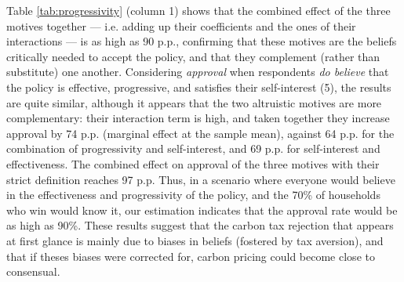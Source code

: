 \documentclass[11pt]{article}
\begin{document}

Table \ref{tab:progressivity} (column 1) shows that the combined effect of the three motives together --- i.e. adding up their coefficients and the ones of their interactions --- is as high as 90 p.p., confirming that these motives are the beliefs critically needed to accept the policy, and that they complement (rather than substitute) one another. Considering \textit{approval} when respondents \textit{do believe} that the policy is effective, progressive, and satisfies their self-interest (5), the results are quite similar, although it appears that the two altruistic motives are more complementary: their interaction term is high, and taken together they increase approval by 74 p.p. (marginal effect at the sample mean), against 64 p.p. for the combination of progressivity and self-interest, and 69 p.p. for self-interest and effectiveness. The combined effect on approval of the three motives with their strict definition reaches 97 p.p. Thus, in a scenario where everyone would believe in the effectiveness and progressivity of the policy, and the 70\% of households who win would know it, our estimation indicates that the approval rate would be as high as 90\%. These results suggest that the carbon tax rejection that appears at first glance is mainly due to biases in beliefs (fostered by tax aversion), and that if theses biases were corrected for, carbon pricing could become close to consensual.
\end{document}
